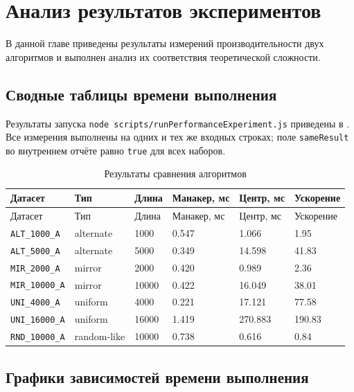 \chapter{Анализ результатов экспериментов} \label{ch3}

В данной главе приведены результаты измерений производительности двух алгоритмов и выполнен анализ их соответствия теоретической сложности.

\section{Сводные таблицы времени выполнения} \label{ch3:sec1}

Результаты запуска \texttt{node scripts/runPerformanceExperiment.js} приведены в . Все измерения выполнены на одних и тех же входных строках; поле \texttt{sameResult} во внутреннем отчёте равно \texttt{true} для всех наборов.

\noindent
\begingroup
\centering
\small
\begin{longtable}[c]{|p{3.2cm}|p{2.7cm}|p{2cm}|p{2.5cm}|p{2.5cm}|p{2cm}|}
    \caption{Результаты сравнения алгоритмов}
    \label{tab:perf-results}
    \\
    \hline
    Датасет & Тип & Длина & Манакер, мс & Центр, мс & Ускорение \\ \hline
    \endfirsthead
    \hline
    Датасет & Тип & Длина & Манакер, мс & Центр, мс & Ускорение \\ \hline
    \endhead
    \hline
    \texttt{ALT\_1000\_A} & alternate & 1000 & 0.547 & 1.066 & 1.95 \\ \hline
    \texttt{ALT\_5000\_A} & alternate & 5000 & 0.349 & 14.598 & 41.83 \\ \hline
    \texttt{MIR\_2000\_A} & mirror & 2000 & 0.420 & 0.989 & 2.36 \\ \hline
    \texttt{MIR\_10000\_A} & mirror & 10000 & 0.422 & 16.049 & 38.01 \\ \hline
    \texttt{UNI\_4000\_A} & uniform & 4000 & 0.221 & 17.121 & 77.58 \\ \hline
    \texttt{UNI\_16000\_A} & uniform & 16000 & 1.419 & 270.883 & 190.83 \\ \hline
    \texttt{RND\_10000\_A} & random-like & 10000 & 0.738 & 0.616 & 0.84 \\ \hline
\end{longtable}
\normalsize
\endgroup

\section{Графики зависимостей времени выполнения} \label{ch3:sec2}

